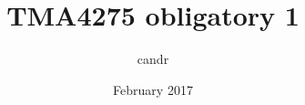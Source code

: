 \documentclass{article}
\title{TMA4275 obligatory 1}
\author{candr}
\date{February 2017}
\begin{document}
\maketitle


\section{}

\end{document}
